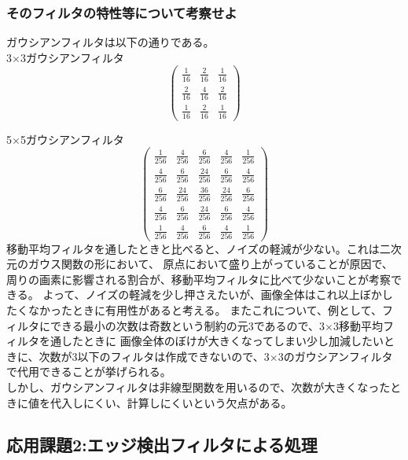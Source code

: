 ﻿\documentclass[a4j,11pt]{jarticle}
\begin{document}
\subsubsection{そのフィルタの特性等について考察せよ}
ガウシアンフィルタは以下の通りである。\\
3$\times$3ガウシアンフィルタ
$$
\begin{pmatrix}
  \frac1 {16} & \frac2 {16} & \frac1 {16} \\
  \frac2 {16} & \frac4 {16} & \frac2 {16} \\
  \frac1 {16} & \frac2 {16} & \frac1 {16}  

\end{pmatrix}
$$

5$\times$5ガウシアンフィルタ
$$
\begin{pmatrix}
  \frac1 {256} & \frac4 {256} & \frac6 {256} & \frac4 {256} & \frac1 {256}\\
  \frac4 {256} & \frac6 {256} & \frac{24} {256} & \frac6 {256} & \frac4 {256}\\
  \frac6 {256} & \frac{24} {256} & \frac{36} {256} & \frac{24} {256} & \frac6 {256}\\
  \frac4 {256} & \frac6 {256} & \frac{24} {256} & \frac6 {256} & \frac4 {256}\\
  \frac1 {256} & \frac4 {256} & \frac6 {256} & \frac4 {256} & \frac1 {256}
\end{pmatrix}
$$
移動平均フィルタを通したときと比べると、ノイズの軽減が少ない。これは二次元のガウス関数の形において、
原点において盛り上がっていることが原因で、周りの画素に影響される割合が、移動平均フィルタに比べて少ないことが考察できる。
よって、ノイズの軽減を少し押さえたいが、画像全体はこれ以上ぼかしたくなかったときに有用性があると考える。
またこれについて、例として、フィルタにできる最小の次数は奇数という制約の元3であるので、3$\times$3移動平均フィルタを通したときに
画像全体のぼけが大きくなってしまい少し加減したいときに、次数が3以下のフィルタは作成できないので、3$\times$3のガウシアンフィルタで代用できることが挙げられる。\\
しかし、ガウシアンフィルタは非線型関数を用いるので、次数が大きくなったときに値を代入しにくい、計算しにくいという欠点がある。




\subsection{応用課題2:エッジ検出フィルタによる処理}
\end{document}
